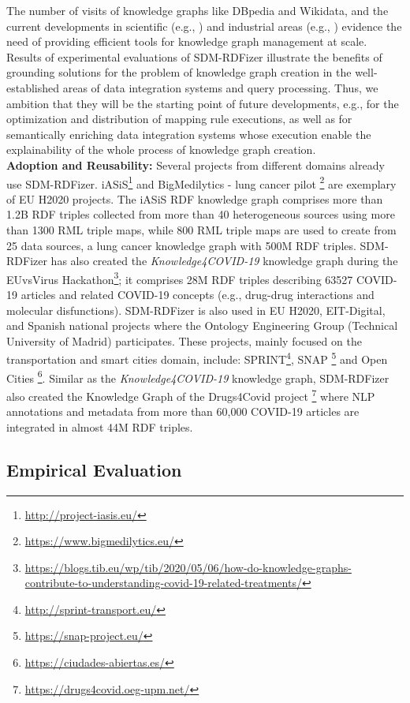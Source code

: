  The number of visits of knowledge graphs like DBpedia and Wikidata, and the current developments in scientific (e.g., \citep{AuerKPKSV18}) and industrial areas (e.g., \citep{NoyGJNPT19}) evidence the need of providing efficient tools for knowledge graph management at scale. Results of experimental evaluations of SDM-RDFizer illustrate the benefits of grounding solutions for the problem of knowledge graph creation in the well-established areas of data integration systems and query processing. Thus, we ambition that they will be the starting point of future developments, e.g., for the optimization and distribution of mapping rule executions, as well as for semantically enriching data integration systems whose execution enable the explainability of the whole process of knowledge graph creation. 
 \\
\textbf{Adoption and Reusability:}
Several projects from different domains already use SDM-RDFizer.
iASiS\footnote{\url{http://project-iasis.eu/}} and BigMedilytics - lung cancer pilot \footnote{\url{https://www.bigmedilytics.eu/}} are exemplary of EU H2020 projects.
The iASiS RDF knowledge graph comprises more than 1.2B RDF triples collected from more than 40 heterogeneous sources using more than 1300 RML triple maps, while 800 RML triple maps are used to create from 25 data sources, a lung cancer knowledge graph with 500M RDF triples. SDM-RDFizer has also created the \textit{Knowledge4COVID-19} knowledge graph during the EUvsVirus Hackathon\footnote{\url{https://blogs.tib.eu/wp/tib/2020/05/06/how-do-knowledge-graphs-contribute-to-understanding-covid-19-related-treatments/}}; it comprises 28M RDF triples describing 63527 COVID-19 articles and related COVID-19 concepts (e.g., drug-drug interactions and molecular disfunctions). SDM-RDFizer is also used in EU H2020, EIT-Digital, and Spanish national projects where the Ontology Engineering Group (Technical University of Madrid) participates. These projects, mainly focused on the transportation and smart cities domain, include: SPRINT\footnote{\url{http://sprint-transport.eu/}}, SNAP \footnote{\url{https://snap-project.eu/}} and Open Cities \footnote{\url{https://ciudades-abiertas.es/}}. Similar as the \textit{Knowledge4COVID-19} knowledge graph, SDM-RDFizer also created the Knowledge Graph of the Drugs4Covid project \footnote{\url{https://drugs4covid.oeg-upm.net/}} where NLP annotations and metadata from more than 60,000 COVID-19 articles are integrated in almost 44M RDF triples.

\subsection{Empirical Evaluation}

